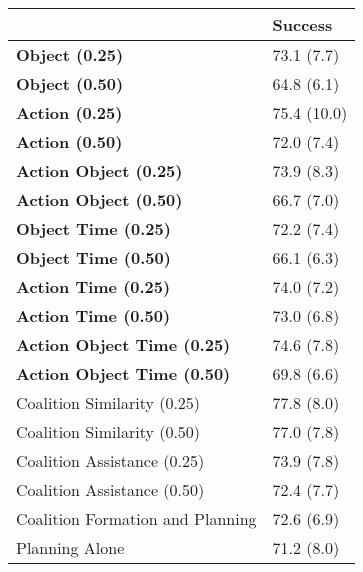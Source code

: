 \begin{tabular}{ll}
\hline
                                    & Success     \\
\hline
 \textbf{Object (0.25)}             & 73.1 (7.7)  \\
 \textbf{Object (0.50)}             & 64.8 (6.1)  \\
 \textbf{Action (0.25)}             & 75.4 (10.0) \\
 \textbf{Action (0.50)}             & 72.0 (7.4)  \\
 \textbf{Action Object (0.25)}      & 73.9 (8.3)  \\
 \textbf{Action Object (0.50)}      & 66.7 (7.0)  \\
 \textbf{Object Time (0.25)}        & 72.2 (7.4)  \\
 \textbf{Object Time (0.50)}        & 66.1 (6.3)  \\
 \textbf{Action Time (0.25)}        & 74.0 (7.2)  \\
 \textbf{Action Time (0.50)}        & 73.0 (6.8)  \\
 \textbf{Action Object Time (0.25)} & 74.6 (7.8)  \\
 \textbf{Action Object Time (0.50)} & 69.8 (6.6)  \\
 Coalition Similarity (0.25)        & 77.8 (8.0)  \\
 Coalition Similarity (0.50)        & 77.0 (7.8)  \\
 Coalition Assistance (0.25)        & 73.9 (7.8)  \\
 Coalition Assistance (0.50)        & 72.4 (7.7)  \\
 Coalition Formation and Planning   & 72.6 (6.9)  \\
 Planning Alone                     & 71.2 (8.0)  \\
\hline
\end{tabular}
